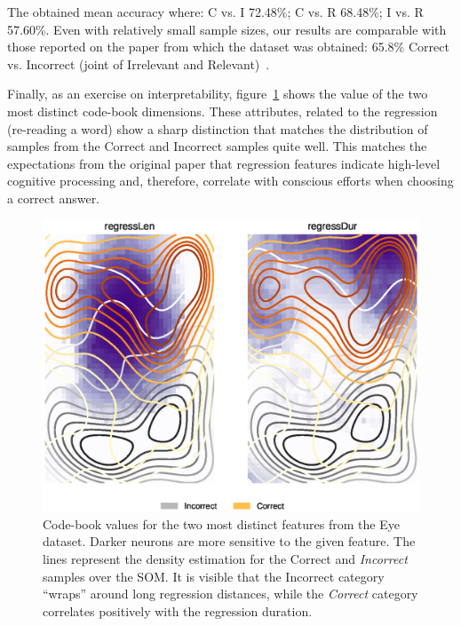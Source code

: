 The obtained mean accuracy where: C vs. I 72.48\%; C vs. R 68.48\%; I vs. R 57.60\%.
Even with relatively small sample sizes, our results are comparable with those
reported on the paper from which the dataset was obtained:
65.8\% Correct vs. Incorrect (joint of Irrelevant and Relevant)~\cite{salojarvi2005inferring}.

Finally, as an exercise on interpretability, figure~\ref{fig:eye_distinct_features}
shows the value of the two most distinct code-book dimensions. These attributes,
related to the regression (re-reading a word) show a sharp distinction that
matches the distribution of samples from the Correct and Incorrect samples quite
well.
This matches the expectations from the original paper that regression features
indicate high-level cognitive processing and,
therefore, correlate with conscious efforts when choosing a correct answer.

\begin{figure}[htb]
    \centering
    \includegraphics[width=\textwidth]{images/6_som/eye_regress.eps}
    \caption[Code-book values for the two most distinct features from the Eye dataset.]{
        Code-book values for the two most distinct features from the Eye dataset.
        Darker neurons are more sensitive to the given feature.
        The lines represent the density estimation for the Correct and \emph{Incorrect} samples
        over the \gls{SOM}.
        It is visible that the Incorrect category ``wraps'' around long regression distances, while the
        \emph{Correct} category correlates positively with the regression duration.
    }
    \label{fig:eye_distinct_features}
\end{figure}


